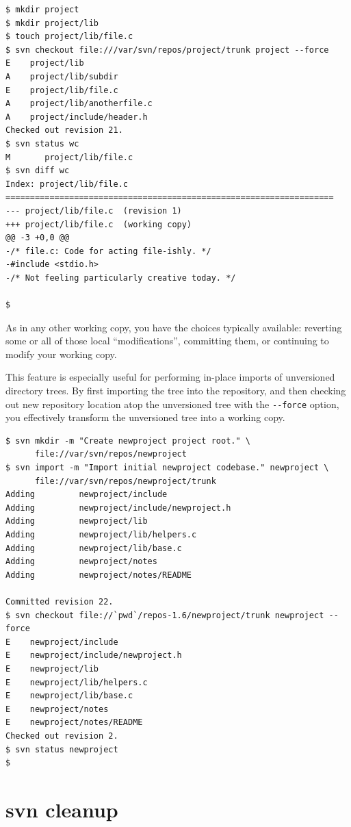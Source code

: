 \begin{verbatim}
$ mkdir project
$ mkdir project/lib
$ touch project/lib/file.c
$ svn checkout file:///var/svn/repos/project/trunk project --force
E    project/lib
A    project/lib/subdir
E    project/lib/file.c
A    project/lib/anotherfile.c
A    project/include/header.h
Checked out revision 21.
$ svn status wc
M       project/lib/file.c
$ svn diff wc
Index: project/lib/file.c
===================================================================
--- project/lib/file.c  (revision 1)
+++ project/lib/file.c  (working copy)
@@ -3 +0,0 @@
-/* file.c: Code for acting file-ishly. */
-#include <stdio.h>
-/* Not feeling particularly creative today. */

$
\end{verbatim}

As in any other working copy, you have the choices typically available:
reverting some or all of those local ``modifications'', committing them,
or continuing to modify your working copy.

This feature is especially useful for performing in-place imports of
unversioned directory trees. By first importing the tree into the
repository, and then checking out new repository location atop the
unversioned tree with the \texttt{-\/-force} option, you effectively
transform the unversioned tree into a working copy.

\begin{verbatim}
$ svn mkdir -m "Create newproject project root." \
      file://var/svn/repos/newproject
$ svn import -m "Import initial newproject codebase." newproject \
      file://var/svn/repos/newproject/trunk
Adding         newproject/include
Adding         newproject/include/newproject.h
Adding         newproject/lib
Adding         newproject/lib/helpers.c
Adding         newproject/lib/base.c
Adding         newproject/notes
Adding         newproject/notes/README

Committed revision 22.
$ svn checkout file://`pwd`/repos-1.6/newproject/trunk newproject --force
E    newproject/include
E    newproject/include/newproject.h
E    newproject/lib
E    newproject/lib/helpers.c
E    newproject/lib/base.c
E    newproject/notes
E    newproject/notes/README
Checked out revision 2.
$ svn status newproject
$
\end{verbatim}

\section{svn cleanup}\label{svn.ref.svn.c.cleanup}

